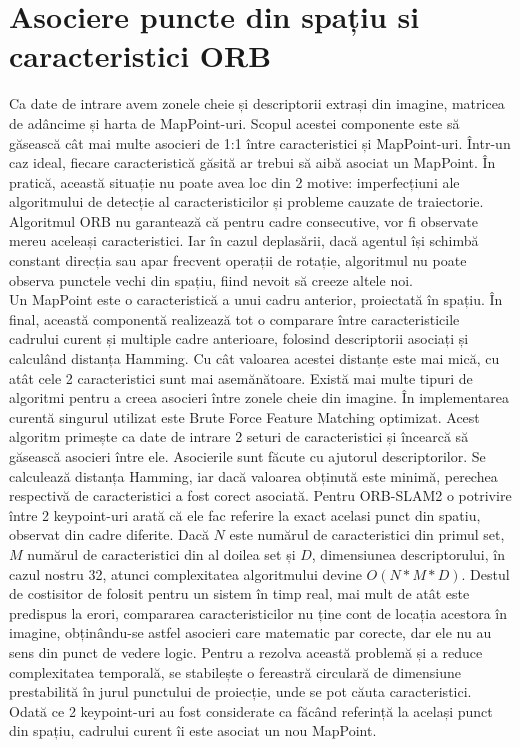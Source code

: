 \documentclass[12pt,a4paper]{report}
\begin{document}
\section{Asociere puncte din spațiu si caracteristici ORB}
Ca date de intrare avem zonele cheie și descriptorii extrași din imagine, matricea
de adâncime și harta de MapPoint-uri. Scopul acestei componente este să găsească
cât mai multe asocieri de 1:1 între caracteristici și MapPoint-uri. Într-un caz ideal,
fiecare caracteristică găsită ar trebui să aibă asociat un MapPoint. În pratică, această situație
nu poate avea loc din 2 motive: imperfecțiuni ale algoritmului de detecție al caracteristicilor 
și probleme cauzate de traiectorie. Algoritmul ORB nu garantează că pentru cadre 
consecutive, vor fi observate mereu aceleași caracteristici. Iar în cazul deplasării,
dacă agentul își schimbă constant direcția sau apar frecvent operații de rotație, algoritmul 
nu poate observa punctele vechi din spațiu, fiind nevoit să creeze altele noi.\\
Un MapPoint este o caracteristică a unui cadru anterior, proiectată în spațiu. În final, 
această componentă realizează tot o comparare între caracteristicile cadrului curent 
și multiple cadre anterioare, folosind descriptorii asociați și calculând distanța Hamming.
Cu cât valoarea acestei distanțe este mai mică, cu atât cele 2 caracteristici sunt 
mai asemănătoare. Există mai multe tipuri de algoritmi pentru a creea asocieri 
între zonele cheie din imagine. În implementarea curentă singurul utilizat este Brute Force Feature Matching
optimizat. Acest algoritm primește ca date de intrare 2 seturi de caracteristici și 
încearcă să găsească asocieri între ele. Asocierile sunt făcute cu ajutorul descriptorilor.
Se calculează distanța Hamming, iar dacă valoarea obținută este minimă, perechea 
respectivă de caracteristici a fost corect asociată. Pentru ORB-SLAM2 
o potrivire între 2 keypoint-uri arată că ele fac referire la exact acelasi punct din spatiu,
observat din cadre diferite.
Dacă \(N\) este numărul de caracteristici din primul set, \(M\) numărul de caracteristici din 
al doilea set și \(D\), dimensiunea descriptorului, în cazul nostru 32, atunci complexitatea
algoritmului devine \(O(N * M * D)\). Destul de costisitor de folosit
pentru un sistem în timp real, mai mult de atât este predispus la erori, compararea 
caracteristicilor nu ține cont de locația acestora în imagine, obținându-se astfel asocieri
care matematic par corecte, dar ele nu au sens din punct de vedere logic. Pentru a rezolva
această problemă și a reduce complexitatea temporală, se stabilește o fereastră circulară de 
dimensiune prestabilită în jurul punctului de proiecție, unde se pot căuta caracteristici.
Odată ce 2 keypoint-uri au fost considerate ca făcând referință la același punct din spațiu,
cadrului curent îi este asociat un nou MapPoint. 
\end{document}
